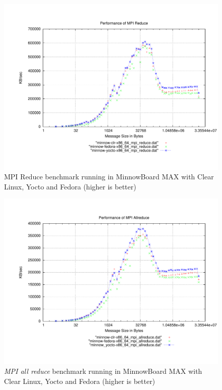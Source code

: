 \begin{figure}[H]
\centering
\includegraphics[width=1 \textwidth]{images/mpbench_yocto_experiments/mpi_reduce.pdf}
\caption{MPI Reduce benchmark running in MinnowBoard MAX with Clear Linux, Yocto
and Fedora (higher is better)}
\label{mpi_reduce_yocto}
\end{figure}

\begin{figure}[H]
\centering
\includegraphics[width=1 \textwidth]{images/mpbench_yocto_experiments/mpi_allreduce.pdf}
\caption{\textit{MPI all reduce} benchmark running in  MinnowBoard MAX with Clear Linux,
Yocto and Fedora (higher is better)}
\label{mpi_allreduce_yocto}
\end{figure}

